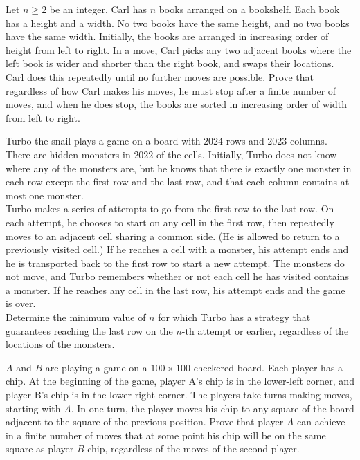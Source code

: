 \begin{problem} [USAJMO 2020]
    Let $n \geq 2$ be an integer. Carl has $n$ books arranged on a bookshelf. Each book has a height and a width. No two books have the same height, and no two books have the same width. Initially, the books are arranged in increasing order of height from left to right. In a move, Carl picks any two adjacent books where the left book is wider and shorter than the right book, and swaps their locations. Carl does this repeatedly until no further moves are possible. Prove that regardless of how Carl makes his moves, he must stop after a finite number of moves, and when he does stop, the books are sorted in increasing order of width from left to right.
\end{problem}

\begin{problem} [IMO 2024]
    Turbo the snail plays a game on a board with $2024$ rows and $2023$ columns. There are hidden monsters in $2022$ of the cells. Initially, Turbo does not know where any of the monsters are, but he knows that there is exactly one monster in each row except the first row and the last row, and that each column contains at most one monster.\\

    Turbo makes a series of attempts to go from the first row to the last row. On each attempt, he chooses to start on any cell in the first row, then repeatedly moves to an adjacent cell sharing a common side. (He is allowed to return to a previously visited cell.) If he reaches a cell with a monster, his attempt ends and he is transported back to the first row to start a new attempt. The monsters do not move, and Turbo remembers whether or not each cell he has visited contains a monster. If he reaches any cell in the last row, his attempt ends and the game is over.\\

    Determine the minimum value of $n$ for which Turbo has a strategy that guarantees reaching the last row on the $n$-th attempt or earlier, regardless of the locations of the monsters.
\end{problem}

\begin{problem} 
    $A$ and $B$ are playing a game on a $100 \times 100$ checkered board. Each player has a chip. At the beginning of the game, player A's chip is in the lower-left corner, and player B's chip is in the lower-right corner. The players take turns making moves, starting with $A$. In one turn, the player moves his chip to any square of the board adjacent to the square of the previous position. Prove that player $A$ can achieve in a finite number of moves that at some point his chip will be on the same square as player $B$ chip, regardless of the moves of the second player.
\end{problem}

